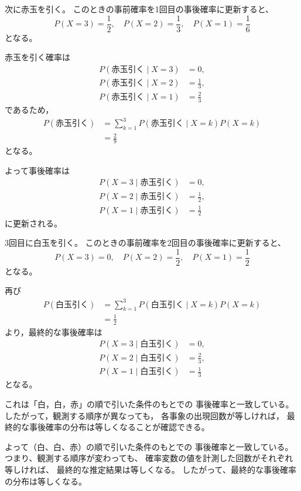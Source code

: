 \documentclass[10pt,a4paper,titlepage]{jreport} %
\begin{document}
次に赤玉を引く。
このときの事前確率を1回目の事後確率に更新すると、
\begin{equation}
P(X=3)=\frac{1}{2},\quad
P(X=2)=\frac{1}{3},\quad
P(X=1)=\frac{1}{6}
\end{equation}
となる。

赤玉を引く確率は
\begin{align}
P(\text{赤玉引く}\mid X=3) &= 0, \\
P(\text{赤玉引く}\mid X=2) &= \frac{1}{3}, \\
P(\text{赤玉引く}\mid X=1) &= \frac{2}{3}
\end{align}
であるため，
\begin{align}
P(\text{赤玉引く})
&= \sum_{k=1}^{3} P(\text{赤玉引く}\mid X=k)P(X=k) \\
&= \frac{2}{9}
\end{align}
となる。

よって事後確率は
\begin{align}
P(X=3\mid \text{赤玉引く}) &= 0, \\
P(X=2\mid \text{赤玉引く}) &= \frac{1}{2}, \\
P(X=1\mid \text{赤玉引く}) &= \frac{1}{2}
\end{align}
に更新される。

3回目に白玉を引く。
このときの事前確率を2回目の事後確率に更新すると、
\begin{equation}
P(X=3)=0,\quad
P(X=2)=\frac{1}{2},\quad
P(X=1)=\frac{1}{2}
\end{equation}
となる。

再び
\begin{align}
P(\text{白玉引く})
&= \sum_{k=1}^{3} P(\text{白玉引く}\mid X=k)P(X=k) \\
&= \frac{1}{2}
\end{align}
より，最終的な事後確率は
\begin{align}
P(X=3\mid \text{白玉引く}) &= 0, \\
P(X=2\mid \text{白玉引く}) &= \frac{2}{3}, \\
P(X=1\mid \text{白玉引く}) &= \frac{1}{3}
\end{align}
となる。

これは「白，白，赤」の順で引いた条件のもとでの
事後確率と一致している。
したがって，観測する順序が異なっても，
各事象の出現回数が等しければ，
最終的な事後確率の分布は等しくなることが確認できる。


よって（白、白、赤）の順で引いた条件のもとでの
事後確率と一致している。
つまり、観測する順序が変わっても、
確率変数の値を計測した回数がそれぞれ等しければ、
最終的な推定結果は等しくなる。
したがって、最終的な事後確率の分布は等しくなる。
\end{document}
